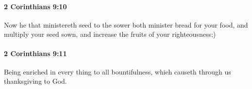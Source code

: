 		\paragraph{2 Corinthians 9:10} %
			\label{2CORINTHIANS-9-10}

			Now he that ministereth seed to the sower both minister bread for your food, and multiply your seed sown, and increase the fruits of your righteousness;)

			\begin{framed}
			\scriptsize
				\begin{compactdesc}
					\item[SBLG] 
				\end{compactdesc}
			\end{framed}

		\paragraph{2 Corinthians 9:11} %
			\label{2CORINTHIANS-9-11}

			Being enriched in every thing to all bountifulness, which causeth through us thanksgiving to God.

